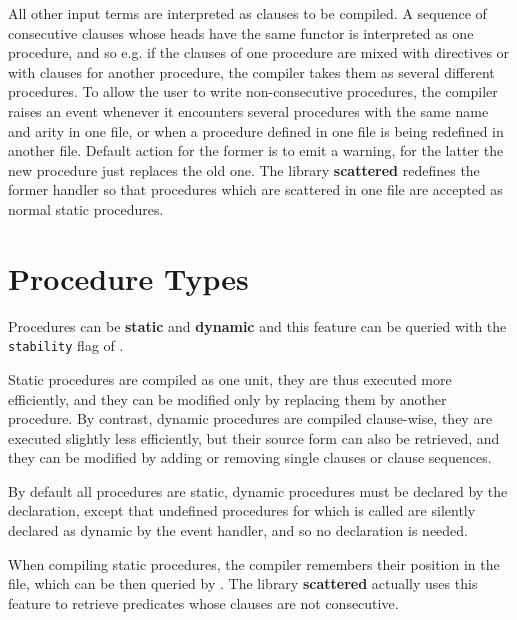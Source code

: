 All other input terms are interpreted as clauses to be compiled.
A sequence of consecutive clauses whose heads have the same
functor is interpreted as one procedure, and so e.g.
if the clauses of one procedure are mixed with directives or
with clauses for another procedure, the compiler
takes them as several different procedures.
To allow the user to write non-consecutive procedures,
the compiler raises an event whenever it
encounters several procedures with the same name and arity
in one file, or when a procedure defined in one file
is being redefined in another file.
Default action for the former is to emit a warning,
for the latter the new procedure just replaces the old one.
The library {\bf scattered} redefines the former handler
so that procedures which are scattered in one file are accepted
as normal static procedures.

\section{Procedure Types}
Procedures can be {\bf static} and {\bf dynamic}
and this feature can be queried with the {\tt stability} flag
of .

Static procedures are compiled as one unit, they are thus executed
more efficiently, and they can be modified only by replacing
them by another procedure.
By contrast, dynamic procedures are compiled clause-wise,
they are executed slightly less efficiently, but their source
form can also be retrieved, and they can be modified
by adding or removing single clauses or clause sequences.

By default all procedures are static, dynamic procedures
must be declared by the  declaration,
except that undefined procedures for which 
is called are silently declared as dynamic by the event handler,
and so no declaration is needed.

When compiling static procedures, the compiler remembers
their position in the file, which can be then queried
by .
The library {\bf scattered} actually uses this feature
to retrieve predicates whose clauses are not consecutive.

